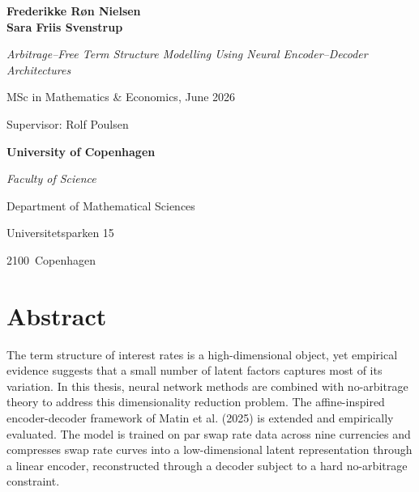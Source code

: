 \documentclass[
  paper=A4,
  11pt,
  twoside=true,
  parskip=full,
  chapterprefix=true,
  headings=normal,
  bibliography=totoc,
  listof=totoc,
  titlepage=on,
  captions=tableabove,
  abstract=on
]{scrreprt}
\title{\thesisTitle}
\author{\thesisName\\\small{Supervised by \thesisExternalSupervisor}}
\date{\thesisDate}
\newcommand{\thesisTitle}{Arbitrage--Free Term Structure Modelling Using Neural Encoder--Decoder Architectures}
\newcommand{\thesisName}{Frederikke R{\o}n Nielsen \\ Sara Friis Svenstrup}
\newcommand{\thesisSubject}{MSc in Mathematics \& Economics}
\newcommand{\thesisDate}{June 2026}
\newcommand{\thesisExternalSupervisor}{Rolf Poulsen}
\newcommand{\thesisUniversity}{University of Copenhagen}
\newcommand{\thesisFaculty}{Faculty of Science}
\newcommand{\thesisInstitute}{Department of Mathematical Sciences}
\newcommand{\thesisCity}{Copenhagen}
\newcommand{\thesisAddress}{Universitetsparken 15}
\newcommand{\thesisPostal}{2100}
\theoremstyle{definition}
\theoremstyle{remark}
\begin{document}
\pagestyle{empty}
\AddToShipoutPicture*{\TitleBackground}
\maketitle
\clearpage

\pagestyle{empty}
\AddToShipoutPicture*{\TitleWatermark}
\thispagestyle{empty}

\vspace*{\fill}

\noindent
\begin{minipage}{0.62\textwidth}
  {\bfseries \thesisName\par}
  \vspace{0.25em}
  {\itshape \thesisTitle\par}
  \vspace{0.25em}
  {\thesisSubject, \thesisDate\par}
  \vspace{0.25em}
  {Supervisor: \thesisExternalSupervisor\par}

  \vspace{1.2cm}

  {\bfseries \thesisUniversity\par}
  \vspace{0.15em}
  {\itshape \thesisFaculty\par}
  \vspace{0.15em}
  {\thesisInstitute\par}
  {\thesisAddress\par}
  {\thesisPostal\ \thesisCity\par}
\end{minipage}

\clearpage

\pagestyle{maincontentstyle}

\chapter*{Abstract}
The term structure of interest rates is a high-dimensional object, yet empirical evidence suggests that a small number of latent factors captures most of its variation. In this thesis, neural network methods are combined with no-arbitrage theory to address this dimensionality reduction problem. The affine-inspired encoder-decoder framework of Matin et al. (2025) is extended and empirically evaluated. The model is trained on par swap rate data across nine currencies and compresses swap rate curves into a low-dimensional latent representation through a linear encoder, reconstructed through a decoder subject to a hard no-arbitrage constraint.
\end{document}
